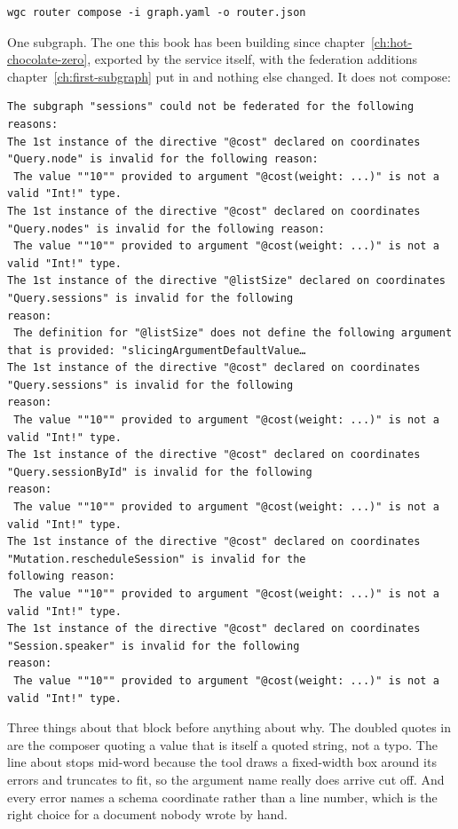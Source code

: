 \begin{verbatim}
wgc router compose -i graph.yaml -o router.json
\end{verbatim}

%
One subgraph. The one this book has been building since
chapter~\ref{ch:hot-chocolate-zero}, exported by the service itself, with the
federation additions chapter~\ref{ch:first-subgraph} put in and nothing else
changed. It does not compose:

\begin{verbatim}
The subgraph "sessions" could not be federated for the following reasons:
The 1st instance of the directive "@cost" declared on coordinates "Query.node" is invalid for the following reason:
 The value ""10"" provided to argument "@cost(weight: ...)" is not a valid "Int!" type.
The 1st instance of the directive "@cost" declared on coordinates "Query.nodes" is invalid for the following reason:
 The value ""10"" provided to argument "@cost(weight: ...)" is not a valid "Int!" type.
The 1st instance of the directive "@listSize" declared on coordinates "Query.sessions" is invalid for the following
reason:
 The definition for "@listSize" does not define the following argument that is provided: "slicingArgumentDefaultValue…
The 1st instance of the directive "@cost" declared on coordinates "Query.sessions" is invalid for the following
reason:
 The value ""10"" provided to argument "@cost(weight: ...)" is not a valid "Int!" type.
The 1st instance of the directive "@cost" declared on coordinates "Query.sessionById" is invalid for the following
reason:
 The value ""10"" provided to argument "@cost(weight: ...)" is not a valid "Int!" type.
The 1st instance of the directive "@cost" declared on coordinates "Mutation.rescheduleSession" is invalid for the
following reason:
 The value ""10"" provided to argument "@cost(weight: ...)" is not a valid "Int!" type.
The 1st instance of the directive "@cost" declared on coordinates "Session.speaker" is invalid for the following
reason:
 The value ""10"" provided to argument "@cost(weight: ...)" is not a valid "Int!" type.
\end{verbatim}

%
Three things about that block before anything about why. The doubled quotes in
 are the composer quoting a value that is itself a quoted string,
not a typo. The line about  stops mid-word because the tool
draws a fixed-width box around its errors and truncates to fit, so the argument
name really does arrive cut off. And every error names a schema coordinate
rather than a line number, which is the right choice for a document nobody
wrote by hand.

